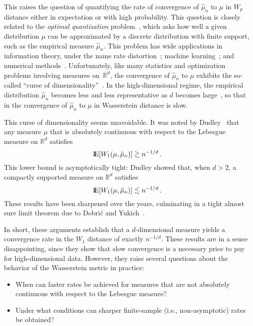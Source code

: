 \documentclass[sts]{imsart}
\newcommand{\RR}{\mathbb{R}}
\begin{document}
This raises the question of quantifying the rate of convergence of $\hat \mu_n$ to $\mu$ in $W_p$ distance either in expectation or with high probability.
This question is closely related to the \emph{optimal quantization} problem~\cite{GraLus07}, which asks how well a given distribution $\mu$ can be approximated by a discrete distribution with finite support, such as the empirical measure $\hat \mu_n$.
This problem has wide applications in information theory, under the name rate distortion~\cite{Sha60,cover2012elements}; machine learning~\cite{GuiRos12,NovEst14}; and numerical methods~\cite{CorPag15}.
Unfortunately, like many statistics and optimization problems involving measures on~$\RR^d$, the convergence of $\hat \mu_n$ to $\mu$ exhibits the so-called ``curse of dimensionality''~\cite{bellman1961adaptive}.
In the high-dimensional regime, the empirical distribution $\hat \mu_n$ becomes less and less representative as $d$ becomes large~\cite{friedman2001elements}, so that in the convergence of $\hat \mu_n$ to $\mu$ in Wasserstein distance is slow.

This curse of dimensionality seems unavoidable.
It was noted by Dudley~\cite{Dud68} that any measure $\mu$ that is absolutely continuous with respect to the Lebesgue measure on $\RR^d$ satisfies
\begin{equation*}
{\rm I}\kern-0.18em{\rm E}[W_1(\mu, \hat \mu_n)] \gtrsim n^{-1/d}\,.
\end{equation*}
This lower bound is asymptotically tight: Dudley showed that, when $d > 2$, a compactly supported measure on $\RR^d$ satisfies
\begin{equation*}
{\rm I}\kern-0.18em{\rm E}[W_1(\mu, \hat \mu_n)] \lesssim n^{-1/d}\,.
\end{equation*}
These results have been sharpened over the years, culminating in a tight almost sure limit theorem due to Dobri\'c and Yukich~\cite{DobYuk95}.

In short, these arguments establish that a $d$-dimensional measure yields a convergence rate in the $W_1$ distance of exactly $n^{-1/d}$.
These results are in a sense disappointing, since they show that slow convergence is a necessary price to pay for high-dimensional data.
However, they raise several questions about the behavior of the Wasserstein metric in practice:
\begin{itemize}
\item When can faster rates be achieved for measures that are not absolutely continuous with respect to the Lebesgue measure?
\item Under what conditions can sharper finite-sample (i.e., non-asymptotic) rates be obtained?
\end{itemize}
\end{document}
